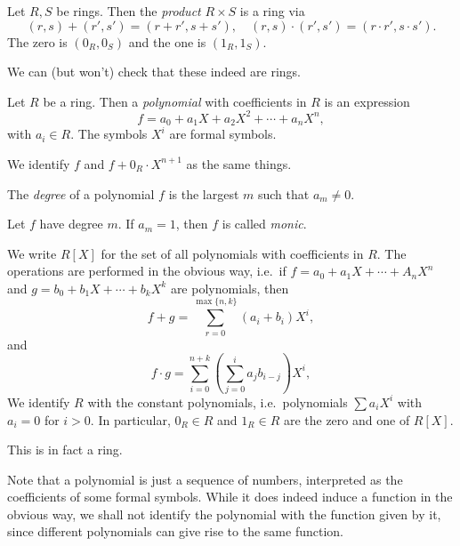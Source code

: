 \documentclass[a4paper]{article}
\begin{document}
\begin{defi}
  Let $R, S$ be rings. Then the \emph{product} $R \times S$ is a ring via
  \[
    (r, s) + (r', s') = (r + r', s + s'),\quad (r, s) \cdot (r', s') = (r\cdot r', s \cdot s').
  \]
  The zero is $(0_R, 0_S)$ and the one is $(1_R, 1_S)$.

  We can (but won't) check that these indeed are rings.
\end{defi}

\begin{defi}[Polynomial]
  Let $R$ be a ring. Then a \emph{polynomial} with coefficients in $R$ is an expression
  \[
    f = a_0 + a_1X + a_2 X^2 + \cdots + a_n X^n,
  \]
  with $a_i \in R$. The symbols $X^i$ are formal symbols.
\end{defi}
We identify $f$ and $f + 0_R \cdot X^{n + 1}$ as the same things.

\begin{defi}
  The \emph{degree} of a polynomial $f$ is the largest $m$ such that $a_m \not= 0$.
\end{defi}

\begin{defi}
  Let $f$ have degree $m$. If $a_m = 1$, then $f$ is called \emph{monic}.
\end{defi}

\begin{defi}
  We write $R[X]$ for the set of all polynomials with coefficients in $R$. The operations are performed in the obvious way, i.e.\ if $f = a_0 + a_1X + \cdots + A_n X^n$ and $g = b_0 + b_1X + \cdots + b_k X^k$ are polynomials, then
  \[
    f + g = \sum_{r = 0}^{\max\{n, k\}} (a_i + b_i) X^i,
  \]
  and
  \[
    f\cdot g = \sum_{i = 0}^{n + k} \left(\sum_{j = 0}^i a_j b_{i - j}\right) X^i,
  \]
  We identify $R$ with the constant polynomials, i.e.\ polynomials $\sum a_i X^i$ with $a_i = 0$ for $i > 0$. In particular, $0_R \in R$ and $1_R \in R$ are the zero and one of $R[X]$.
\end{defi}
This is in fact a ring.

Note that a polynomial is just a sequence of numbers, interpreted as the coefficients of some formal symbols. While it does indeed induce a function in the obvious way, we shall not identify the polynomial with the function given by it, since different polynomials can give rise to the same function.
\end{document}
